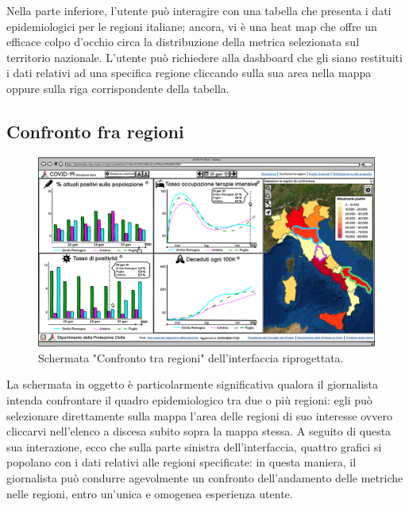 \documentclass[../../main.tex]{subfiles}
\begin{document}
Nella parte inferiore, l'utente può interagire con una tabella che presenta i dati epidemiologici per le regioni italiane; ancora, vi è una heat map che offre un efficace colpo d'occhio circa la distribuzione della metrica selezionata sul territorio nazionale. L'utente può richiedere alla dashboard che gli siano restituiti i dati relativi ad una specifica regione cliccando sulla sua area nella mappa oppure sulla riga corrispondente della tabella.

\clearpage
\subsection{Confronto fra regioni}
\begin{figure}[h]
    \centering
    \includegraphics[width = \textwidth]{res/img/1 - Confronto fra regioni}
    \caption{Schermata "Confronto tra regioni" dell'interfaccia riprogettata.}
    \label{fig:confronto-regioni}
\end{figure}
La schermata in oggetto è particolarmente significativa qualora il giornalista intenda confrontare il quadro epidemiologico tra due o più regioni: egli può selezionare direttamente sulla mappa l'area delle regioni di suo interesse ovvero cliccarvi nell'elenco a discesa subito sopra la mappa stessa. A seguito di questa sua interazione, ecco che sulla parte sinistra dell'interfaccia, quattro grafici si popolano con i dati relativi alle regioni specificate: in questa maniera, il giornalista può condurre agevolmente un confronto dell'andamento delle metriche nelle regioni, entro un'unica e omogenea esperienza utente.
\clearpage
\end{document}
